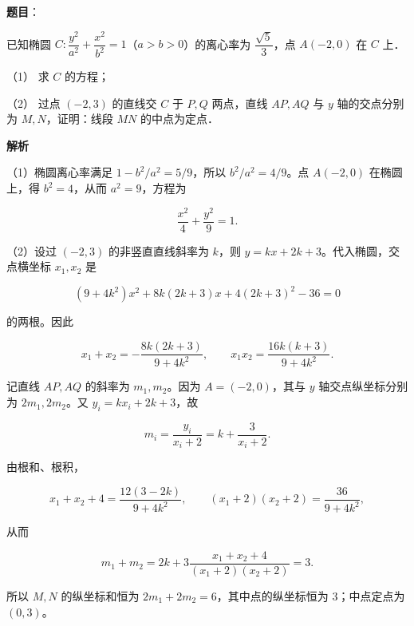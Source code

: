 \begin{answer}

\textbf{题目}：

已知椭圆 $C:\dfrac{y^2}{a^2}+\dfrac{x^2}{b^2}=1$（$a>b>0$）的离心率为 $\dfrac{\sqrt5}{3}$，点 $A(-2,0)$ 在 $C$ 上．

（1） 求 $C$ 的方程；

（2） 过点 $(-2,3)$ 的直线交 $C$ 于 $P,Q$ 两点，直线 $AP,AQ$ 与 $y$ 轴的交点分别为 $M,N$，证明：线段 $MN$ 的中点为定点．

\textbf{解析}


（1）椭圆离心率满足 $1-b^2/a^2=5/9$，所以 $b^2/a^2=4/9$。点 $A(-2,0)$ 在椭圆上，得 $b^2=4$，从而 $a^2=9$，方程为

\nopagebreak[4]
\[
\frac{x^2}{4}+\frac{y^2}{9}=1.
\]


（2）设过 $(-2,3)$ 的非竖直直线斜率为 $k$，则 $y=kx+2k+3$。代入椭圆，交点横坐标 $x_1,x_2$ 是

\nopagebreak[4]
\[
(9+4k^2)x^2+8k(2k+3)x+4(2k+3)^2-36=0
\]

的两根。因此

\nopagebreak[4]
\[
x_1+x_2=-\frac{8k(2k+3)}{9+4k^2},\qquad
x_1x_2=\frac{16k(k+3)}{9+4k^2}.
\]

记直线 $AP,AQ$ 的斜率为 $m_1,m_2$。因为 $A=(-2,0)$，其与 $y$ 轴交点纵坐标分别为 $2m_1,2m_2$。又 $y_i=kx_i+2k+3$，故

\nopagebreak[4]
\[
m_i=\frac{y_i}{x_i+2}=k+\frac3{x_i+2}.
\]

由根和、根积，

\nopagebreak[4]
\[
x_1+x_2+4=\frac{12(3-2k)}{9+4k^2},\qquad
(x_1+2)(x_2+2)=\frac{36}{9+4k^2},
\]

从而

\nopagebreak[4]
\[
m_1+m_2=2k+3\frac{x_1+x_2+4}{(x_1+2)(x_2+2)}=3.
\]

所以 $M,N$ 的纵坐标和恒为 $2m_1+2m_2=6$，其中点的纵坐标恒为 $3$；中点定点为 $(0,3)$。



\end{answer}
